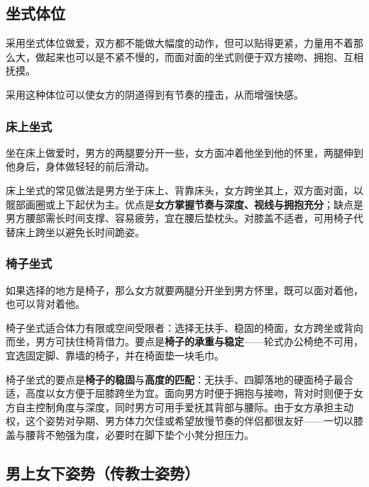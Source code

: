\documentclass[12pt,UTF8]{ctexbook}
\begin{document}
\vspace{0.5em}
\subsection{坐式体位}

采用坐式体位做爱，双方都不能做大幅度的动作，但可以贴得更紧，力量用不着那么大，做起来也可以是不紧不慢的，而面对面的坐式则便于双方接吻、拥抱、互相抚摸。

采用这种体位可以使女方的阴道得到有节奏的撞击，从而增强快感。

\vspace{0.5em}
\subsubsection{床上坐式}

坐在床上做爱时，男方的两腿要分开一些，女方面冲着他坐到他的怀里，两腿伸到他身后，身体做轻轻的前后滑动。

\vspace{0.5em}

床上坐式的常见做法是男方坐于床上、背靠床头，女方跨坐其上，双方面对面，以髋部画圈或上下起伏为主。优点是\textbf{女方掌握节奏与深度、视线与拥抱充分}；缺点是男方腰部需长时间支撑、容易疲劳，宜在腰后垫枕头。对膝盖不适者，可用椅子代替床上跨坐以避免长时间跪姿。

\subsubsection{椅子坐式}

如果选择的地方是椅子，那么女方就要两腿分开坐到男方怀里，既可以面对着他，也可以背对着他。


椅子坐式适合体力有限或空间受限者：选择无扶手、稳固的椅面，女方跨坐或背向而坐，男方可扶住椅背借力。要点是\textbf{椅子的承重与稳定}——轮式办公椅绝不可用，宜选固定脚、靠墙的椅子，并在椅面垫一块毛巾。

椅子坐式的要点是\textbf{椅子的稳固}与\textbf{高度的匹配}：无扶手、四脚落地的硬面椅子最合适，高度以女方便于屈膝跨坐为宜。面向男方时便于拥抱与接吻，背对时则便于女方自主控制角度与深度，同时男方可用手爱抚其背部与腰际。由于女方承担主动权，这个姿势对孕期、男方体力欠佳或希望放慢节奏的伴侣都很友好——一切以膝盖与腰背不勉强为度，必要时在脚下垫个小凳分担压力。

\subsection{男上女下姿势（传教士姿势）}
\end{document}
